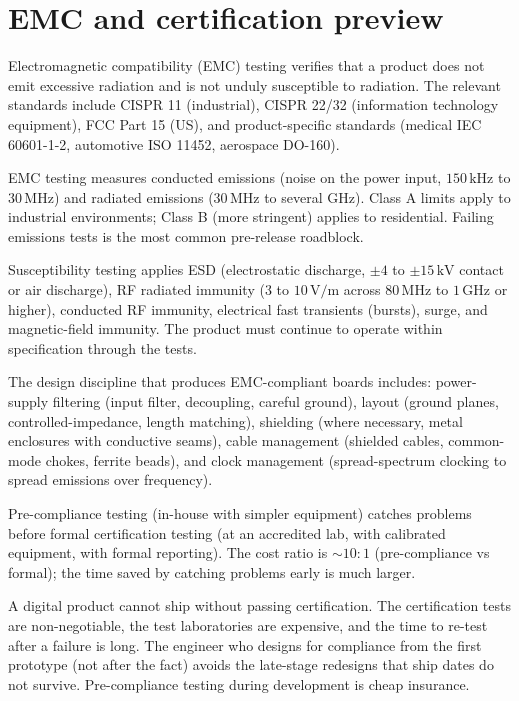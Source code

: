 \section{EMC and certification preview}

Electromagnetic compatibility (EMC) testing verifies that a product does not emit excessive radiation and is not unduly susceptible to radiation. The relevant standards include CISPR 11 (industrial), CISPR 22/32 (information technology equipment), FCC Part 15 (US), and product-specific standards (medical IEC 60601-1-2, automotive ISO 11452, aerospace DO-160).

EMC testing measures conducted emissions (noise on the power input, $150\,\text{kHz}$ to $30\,\text{MHz}$) and radiated emissions ($30\,\text{MHz}$ to several $\text{GHz}$). Class A limits apply to industrial environments; Class B (more stringent) applies to residential. Failing emissions tests is the most common pre-release roadblock.

Susceptibility testing applies ESD (electrostatic discharge, $\pm 4$ to $\pm 15\,\text{kV}$ contact or air discharge), RF radiated immunity ($3$ to $10\,\text{V/m}$ across $80\,\text{MHz}$ to $1\,\text{GHz}$ or higher), conducted RF immunity, electrical fast transients (bursts), surge, and magnetic-field immunity. The product must continue to operate within specification through the tests.

The design discipline that produces EMC-compliant boards includes: power-supply filtering (input filter, decoupling, careful ground), layout (ground planes, controlled-impedance, length matching), shielding (where necessary, metal enclosures with conductive seams), cable management (shielded cables, common-mode chokes, ferrite beads), and clock management (spread-spectrum clocking to spread emissions over frequency).

Pre-compliance testing (in-house with simpler equipment) catches problems before formal certification testing (at an accredited lab, with calibrated equipment, with formal reporting). The cost ratio is $\sim 10:1$ (pre-compliance vs formal); the time saved by catching problems early is much larger.

\begin{principle}
A digital product cannot ship without passing certification. The certification tests are non-negotiable, the test laboratories are expensive, and the time to re-test after a failure is long. The engineer who designs for compliance from the first prototype (not after the fact) avoids the late-stage redesigns that ship dates do not survive. Pre-compliance testing during development is cheap insurance.
\end{principle}

